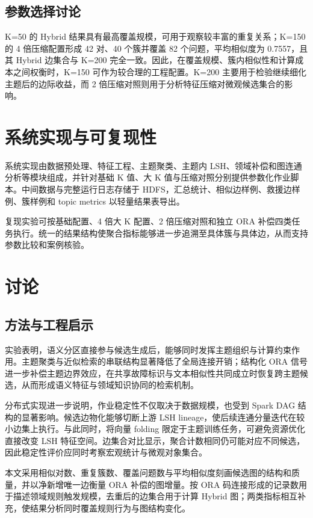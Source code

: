 \documentclass[a4paper,UTF8,zihao=5,fontset=windows]{ctexart}
\begin{document}
\subsection{参数选择讨论}

K=50 的 Hybrid 结果具有最高覆盖规模，可用于观察较丰富的重复关系；K=150 的 4 倍压缩配置形成 42 对、40 个簇并覆盖 82 个问题，平均相似度为 0.7557，且其 Hybrid 边集合与 K=200 完全一致。因此，在覆盖规模、簇内相似性和计算成本之间权衡时，K=150 可作为较合理的工程配置。K=200 主要用于检验继续细化主题后的边际收益，而 2 倍压缩对照则用于分析特征压缩对微观候选集合的影响。



\section{系统实现与可复现性}

系统实现由数据预处理、特征工程、主题聚类、主题内 LSH、领域补偿和图连通分析等模块组成，并针对基础 K 值、大 K 值与压缩对照分别提供参数化作业脚本。中间数据与完整运行日志存储于 HDFS，汇总统计、相似边样例、救援边样例、簇样例和 topic metrics 以轻量结果表导出。

复现实验可按基础配置、4 倍大 K 配置、2 倍压缩对照和独立 ORA 补偿四类任务执行。统一的结果结构使聚合指标能够进一步追溯至具体簇与具体边，从而支持参数比较和案例核验。

\section{讨论}

\subsection{方法与工程启示}

实验表明，语义分区直接参与候选生成后，能够同时发挥主题组织与计算约束作用。主题聚类与近似检索的串联结构显著降低了全局连接开销；结构化 ORA 信号进一步补偿主题边界效应，在共享故障标识与文本相似性共同成立时恢复跨主题候选，从而形成语义特征与领域知识协同的检索机制。

分布式实现进一步说明，作业稳定性不仅取决于数据规模，也受到 Spark DAG 结构的显著影响。候选边物化能够切断上游 LSH lineage，使后续连通分量迭代在较小边集上执行。与此同时，将向量 folding 限定于主题训练任务，可避免资源优化直接改变 LSH 特征空间。边集合对比显示，聚合计数相同仍可能对应不同候选，因此稳定性评价应同时考察宏观统计与微观对象集合。

本文采用相似对数、重复簇数、覆盖问题数与平均相似度刻画候选图的结构和质量，并以净新增唯一边衡量 ORA 补偿的图增量。按 ORA 码连接形成的记录数用于描述领域规则触发规模，去重后的边集合用于计算 Hybrid 图；两类指标相互补充，使结果分析同时覆盖规则行为与图结构变化。
\end{document}
